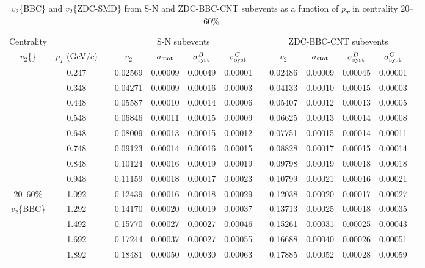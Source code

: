 \documentclass[aps,prc,superscriptaddress,showpacs,floatfix,twocolumn]{revtex4}
\newcommand \gevc{GeV/$c$\xspace}
\newcommand \pt{\mbox{$p_T$}\xspace}
\begin{document}
\begin{table}[htbp]
\caption{\label{tab:table_v2_cent20-60}
$v_2$\{BBC\} and $v_2$\{ZDC-SMD\}
from S-N and ZDC-BBC-CNT subevents as a function of \pt in centrality 
20--60\%.
}
\begingroup \squeezetable
\begin{ruledtabular} \begin{tabular}{c|cccccccccccc}
Centrality
 & & & \multicolumn{4}{c}{S-N subevents} & & \multicolumn{4}{c}{ZDC-BBC-CNT subevents} \\ 
$v_2$\{\}
 &$\pt$ (\gevc) & & $v_2$ & $\sigma_{\rm stat}$ & $\sigma_{\rm syst}^B$ & $\sigma_{\rm syst}^C$ 
& & $v_2$ & $\sigma_{\rm stat}$ & $\sigma_{\rm syst}^B$ & $\sigma_{\rm syst}^C$ \\ 
\hline
 & 0.247 && 0.02569 & 0.00009 & 0.00049 & 0.00001 & & 0.02486 & 0.00009 & 0.00045 & 0.00001 \\ 
 & 0.348 && 0.04271 & 0.00009 & 0.00016 & 0.00003 & & 0.04133 & 0.00010 & 0.00015 & 0.00003 \\ 
 & 0.448 && 0.05587 & 0.00010 & 0.00014 & 0.00006 & & 0.05407 & 0.00012 & 0.00013 & 0.00005 \\ 
 & 0.548 && 0.06846 & 0.00011 & 0.00015 & 0.00009 & & 0.06625 & 0.00013 & 0.00014 & 0.00008 \\ 
 & 0.648 && 0.08009 & 0.00013 & 0.00015 & 0.00012 & & 0.07751 & 0.00015 & 0.00014 & 0.00011 \\ 
 & 0.748 && 0.09123 & 0.00014 & 0.00016 & 0.00015 & & 0.08828 & 0.00017 & 0.00015 & 0.00014 \\ 
 & 0.848 && 0.10124 & 0.00016 & 0.00019 & 0.00019 & & 0.09798 & 0.00019 & 0.00018 & 0.00018 \\ 
 & 0.948 && 0.11159 & 0.00018 & 0.00017 & 0.00023 & & 0.10799 & 0.00021 & 0.00016 & 0.00021 \\ 
20--60\%
 & 1.092 && 0.12439 & 0.00016 & 0.00018 & 0.00029 & & 0.12038 & 0.00020 & 0.00017 & 0.00027 \\ 
$v_2$\{BBC\}
 & 1.292 && 0.14170 & 0.00020 & 0.00019 & 0.00037 & & 0.13713 & 0.00025 & 0.00018 & 0.00035 \\ 
 & 1.492 && 0.15770 & 0.00027 & 0.00027 & 0.00046 & & 0.15261 & 0.00031 & 0.00025 & 0.00043 \\ 
 & 1.692 && 0.17244 & 0.00037 & 0.00027 & 0.00055 & & 0.16688 & 0.00040 & 0.00026 & 0.00051 \\ 
 & 1.892 && 0.18481 & 0.00050 & 0.00030 & 0.00063 & & 0.17885 & 0.00052 & 0.00028 & 0.00059 \\ 

\end{tabular}
\end{ruledtabular}
\end{table}
\end{document}
